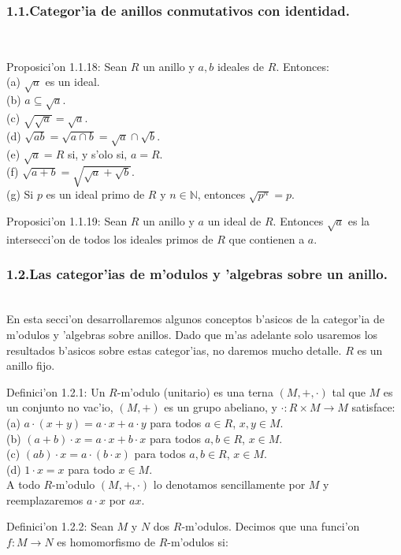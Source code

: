 \documentclass[10pt]{beamer}
\renewcommand{\N}{\mathbb{N}}
\renewcommand{\ri}{\textit{R}}
\begin{document}
\begin{frame}
\frametitle{1.1.Categor'ia de anillos conmutativos con identidad.}\\
\begin{block}{Proposici'on 1.1.18:} 
Sean $R$ un anillo y $a,b$ ideales de $R$. Entonces:\\
(a) $\sqrt{a}$ es un ideal.\\
(b) $a \subseteq \sqrt{a}$.\\
(c) $\sqrt{\sqrt{a}}=\sqrt{a}$.\\
(d) $\sqrt{ab}=\sqrt{a\cap b}= \sqrt{a}\cap \sqrt{b}$.\\
(e) $\sqrt{a}=R$ si, y s'olo si, $a=R$.\\
(f) $\sqrt{a+b}=\sqrt{\sqrt{a}+\sqrt{b}}$.\\
(g) Si $p$ es un ideal primo de $R$ y $n \in \N$, entonces $\sqrt{p^n}=p$.\\
\end{block}
\begin{block}{Proposici'on 1.1.19:}
Sean $R$ un anillo y $a$ un ideal de $R$. Entonces $\sqrt{a}$ es la intersecci'on de todos los ideales primos de $R$ que contienen a $a$.\\
\end{block}
\vspace{5cm}
\end{frame}







\begin{frame}
\frametitle{1.2.Las categor'ias de m'odulos y 'algebras sobre un anillo.}\\
En esta secci'on desarrollaremos algunos conceptos b'asicos de la categor'ia de m'odulos y 'algebras sobre anillos. Dado que m'as adelante solo usaremos los resultados b'asicos sobre estas categor'ias, no daremos mucho detalle. $\ri$ es un anillo fijo.\\
\begin{block}{Definici'on 1.2.1:}
Un $\ri$-m'odulo (unitario) es una terna $(M,+,\cdot)$ tal que $M$ es un conjunto no vac'io, $(M,+)$ es un grupo abeliano, y $\cdot : \ri \times M \longrightarrow M$ satisface:\\
(a) $a \cdot (x+y)= a \cdot x + a \cdot y$ para todos $a \in \ri$, $x,y \in M$.\\
(b) $(a+b) \cdot x= a \cdot x + b \cdot x$ para todos $a,b \in \ri$, $x \in M$.\\
(c) $(ab) \cdot x = a \cdot (b \cdot x)$ para todos $a,b \in \ri$, $x \in M$.\\
(d) $1 \cdot x = x$ para todo $x \in M$.\\
 A todo $\ri$-m'odulo $(M,+,\cdot)$ lo denotamos sencillamente por $M$ y reemplazaremos $a \cdot x$ por $ax$.\\
\end{block}
\begin{block}{Definici'on 1.2.2:} 
Sean $M$ y $N$ dos $\ri$-m'odulos. Decimos que una funci'on $f:M\rightarrow N$ es homomorfismo de $\ri$-m'odulos si:\\
\end{block}
\end{frame}
\end{document}
